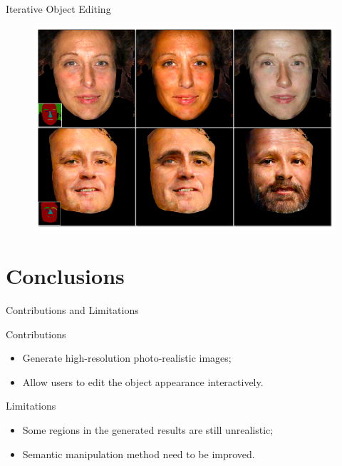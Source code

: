 \documentclass{beamer}
\begin{document}
\begin{frame}{Iterative Object Editing}
\begin{figure}
	\centering
	\includegraphics[height=0.6\textheight]{images/result_4}
\end{figure}
\end{frame}







\section{Conclusions}
\begin{frame}{Contributions and Limitations}
%
%
\begin{beamerboxesrounded}[upper=uppercol,lower=lowercol,shadow=false]{	Contributions }

\begin{itemize}
	
	\item
	Generate high-resolution photo-realistic images;
	\item
	Allow users to edit the object appearance interactively.
\end{itemize}
\end{beamerboxesrounded}%
%


\begin{beamerboxesrounded}[upper=uppercol,lower=lowercol,shadow=false]{	Limitations }

\begin{itemize}
	
	\item
	Some regions in the generated results are still unrealistic;
	\item
	Semantic manipulation method need to be improved.
\end{itemize}
\end{beamerboxesrounded}


\end{frame}
\end{document}
